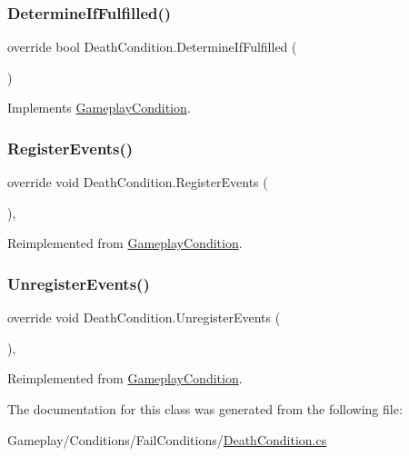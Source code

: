 \subsubsection{\texorpdfstring{Determine\+If\+Fulfilled()}{DetermineIfFulfilled()}}
{\footnotesize\ttfamily override bool Death\+Condition.\+Determine\+If\+Fulfilled (\begin{DoxyParamCaption}{ }\end{DoxyParamCaption})\hspace{0.3cm}{\ttfamily [virtual]}}



Implements \mbox{\hyperlink{class_gameplay_condition_a7788119247b929ae43f7c134767e589e}{Gameplay\+Condition}}.

\mbox{\label{class_death_condition_a6cb1fe3d0a6eb7df7c91df62bd549b46}} 
\subsubsection{\texorpdfstring{Register\+Events()}{RegisterEvents()}}
{\footnotesize\ttfamily override void Death\+Condition.\+Register\+Events (\begin{DoxyParamCaption}{ }\end{DoxyParamCaption})\hspace{0.3cm}{\ttfamily [protected]}, {\ttfamily [virtual]}}



Reimplemented from \mbox{\hyperlink{class_gameplay_condition_ae40b690b7dbe3977bcd4429b7bf95afb}{Gameplay\+Condition}}.

\mbox{\label{class_death_condition_ad6c07ec8151eb65a0ef1844853b526a0}} 
\subsubsection{\texorpdfstring{Unregister\+Events()}{UnregisterEvents()}}
{\footnotesize\ttfamily override void Death\+Condition.\+Unregister\+Events (\begin{DoxyParamCaption}{ }\end{DoxyParamCaption})\hspace{0.3cm}{\ttfamily [protected]}, {\ttfamily [virtual]}}



Reimplemented from \mbox{\hyperlink{class_gameplay_condition_a70bf44c9b6395036a59c58611578cac6}{Gameplay\+Condition}}.



The documentation for this class was generated from the following file\+:\begin{DoxyCompactItemize}
\item 
Gameplay/\+Conditions/\+Fail\+Conditions/\mbox{\hyperlink{_death_condition_8cs}{Death\+Condition.\+cs}}\end{DoxyCompactItemize}
